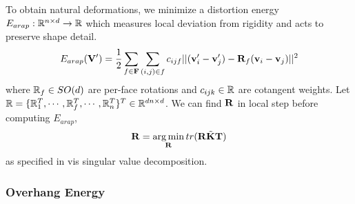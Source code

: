 To obtain natural deformations, we minimize a distortion energy $E_{arap}:  \mathbb{R}^{n \times d} \to \mathbb{R}$ which measures local deviation from rigidity and acts to preserve shape detail.~\cite{sorkine_arap_2007}
\[
    E_{arap}(\mathbf{V}') = \frac{1}{2} \sum_{f\in \mathbf{F}} \sum_{(i,j)\in f} c_{ijf} || (\mathbf{v}_i' - \mathbf{v}_j') - \mathbf{R}_f(\mathbf{v}_i - \mathbf{v}_j) ||^2
\]
where $\mathbb{R}_f \in SO(d)$ are per-face rotations and $c_{ijk}\in \mathbb{R}$ are cotangent weights. Let $\mathbb{R} = \{\mathbb{R}_1^T, \cdots, \mathbb{R}_f^T, \cdots, \mathbb{R}_n^T \}^T \in \mathbb{R}^{dn \times d}$. We can find $\mathbf{R}$ in local step before computing $E_{arap}$,
\[
    \mathbf{R} = \operatorname*{arg\,min}_{\mathbf{R}} tr(\mathbf{R}\tilde{\mathbf{K}}\mathbf{T})
\]
as specified in \cite{jacobson_fast_2012} vis singular value decomposition.

    

\subsubsection*{Overhang Energy}

